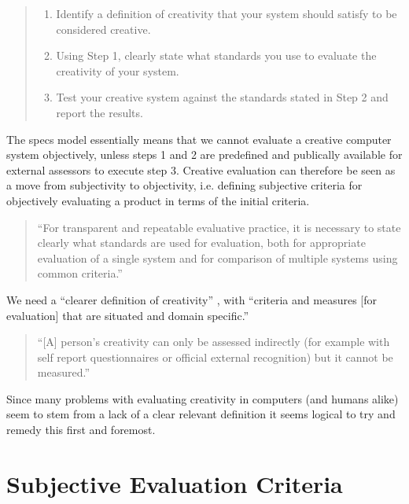 \begin{quote}
  \begin{enumerate}
    \item Identify a definition of creativity that your system should satisfy to be considered creative.
    \item Using Step 1, clearly state what standards you use to evaluate the creativity of your system.
    \item Test your creative system against the standards stated in Step 2 and report the results.
  \end{enumerate}
\end{quote}

The \gls{specs} model essentially means that we cannot evaluate a creative computer system objectively, unless steps 1 and 2 are predefined and publically available for external assessors to execute step 3. Creative evaluation can therefore be seen as a move from subjectivity to objectivity, i.e. defining subjective criteria for objectively evaluating a product in terms of the initial criteria.

\begin{quotation}
  ``For transparent and repeatable evaluative practice, it is necessary to state clearly what standards are used for evaluation, both for appropriate evaluation of a single system and for comparison of multiple systems using common criteria.'' 
\end{quotation}

We need a ``clearer definition of creativity'' \autocite[p.459]{Mayer1999}, with ``criteria and measures [for evaluation] that are situated and domain specific.'' \autocite[p.7]{Candy2012}

\begin{quotation}
  ``[A] person's creativity can only be assessed indirectly (for example with self report questionnaires or official external recognition) but it cannot be measured.'' 
\end{quotation}

Since many problems with evaluating creativity in computers (and humans alike) seem to stem from a lack of a clear relevant definition it seems logical to try and remedy this first and foremost.


\section{Subjective Evaluation Criteria}

